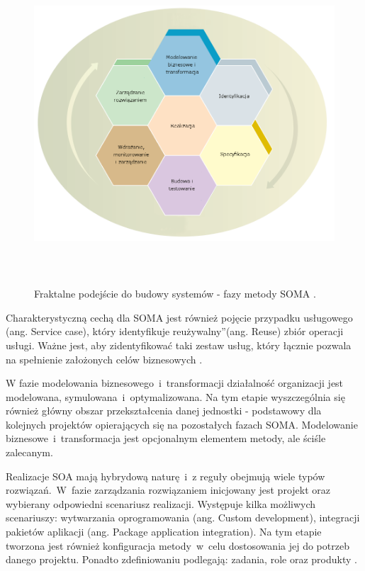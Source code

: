 \begin{figure}[h!tbp]
\begin{centering}
\includegraphics[width=14cm, height=12cm]{img/soma_fractal_lifecycle.png}
\caption[Fraktalne podejście do budowy systemów - fazy metody SOMA.]{Fraktalne podejście do budowy systemów - fazy metody SOMA \cite{SOMAArsIBMJour}.}\label{soma_fractal_lifecycle}
\end{centering}
\end{figure}

Charakterystyczną cechą dla SOMA jest również pojęcie przypadku usługowego (ang. Service case), który identyfikuje \quotedblbase reużywalny\textquotedblright (ang. Reuse) zbiór operacji usługi. Ważne jest, aby zidentyfikować taki zestaw usług, który łącznie pozwala na spełnienie założonych celów biznesowych \cite{PlatIntGor}.

W fazie modelowania biznesowego~i~transformacji działalność organizacji jest modelowana, symulowana~i~optymalizowana. Na tym etapie wyszczególnia się również główny obszar przekształcenia danej jednostki - podstawowy dla kolejnych projektów opierających się na pozostałych fazach SOMA. Modelowanie biznesowe~i~transformacja jest opcjonalnym elementem metody, ale ściśle zalecanym. 

Realizacje SOA mają hybrydową naturę~i~z reguły obejmują wiele typów rozwiązań.~W~fazie zarządzania rozwiązaniem inicjowany jest projekt oraz wybierany odpowiedni scenariusz realizacji. Występuje kilka możliwych scenariuszy: wytwarzania oprogramowania (ang. Custom development), integracji pakietów aplikacji (ang. Package application integration). Na tym etapie tworzona jest również konfiguracja metody~w~celu dostosowania jej do potrzeb danego projektu. Ponadto zdefiniowaniu podlegają: zadania, role oraz produkty \cite{SOMAArsIBMJour}.

